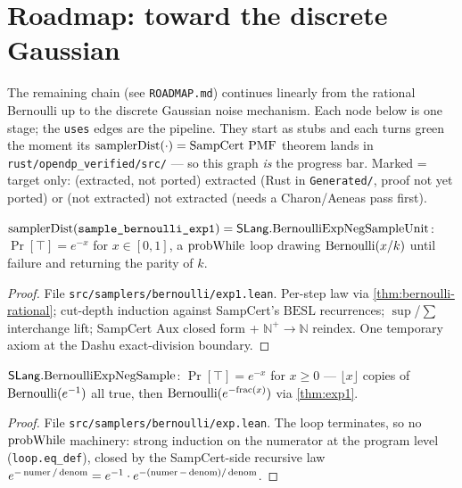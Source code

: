 \chapter{Roadmap: toward the discrete Gaussian}\label{chap:roadmap}

The remaining chain (see \texttt{ROADMAP.md}) continues linearly from the rational
Bernoulli up to the discrete Gaussian noise mechanism. Each node below is one
stage; the \texttt{uses} edges are the pipeline. They start as stubs and each turns
green the moment its \(\mathrm{samplerDist}(\cdot) = \text{SampCert PMF}\) theorem lands in
\texttt{rust/opendp\_verified/src/} --- so this graph \emph{is} the progress bar. Marked
\statusStub{} = target only: (extracted, not ported) extracted (Rust in \texttt{Generated/}, proof not
yet ported) or (not extracted) not extracted (needs a Charon/Aeneas pass first).

\begin{theorem}\label{thm:exp1}
  \leanok
  \(\mathrm{samplerDist}(\texttt{sample\_bernoulli\_exp1}) =
  \mathsf{SLang}.\mathrm{BernoulliExpNegSampleUnit}\): \(\Pr[\top] = e^{-x}\) for
  \(x \in [0,1]\), a \(\mathrm{probWhile}\) loop drawing \(\mathrm{Bernoulli}(x/k)\) until failure and
  returning the parity of \(k\). \statusDone
\end{theorem}
\begin{proof}\leanok
  File \texttt{src/samplers/bernoulli/exp1.lean}. Per-step law via
  \ref{thm:bernoulli-rational}; cut-depth induction against SampCert's
  \(\mathrm{BESL}\) recurrences; \(\sup\)/\(\sum\) interchange lift; SampCert
  \(\mathrm{Aux}\) closed form + \(\mathbb{N}^{+}\!\to\mathbb{N}\) reindex. One
  temporary axiom at the Dashu exact-division boundary.
\end{proof}

\begin{theorem}\label{thm:exp}
  \leanok
  \(\mathsf{SLang}.\mathrm{BernoulliExpNegSample}\): \(\Pr[\top]=e^{-x}\)
  for \(x \ge 0\) --- \(\lfloor x\rfloor\) copies of \(\mathrm{Bernoulli}(e^{-1})\) all true, then
  \(\mathrm{Bernoulli}(e^{-\mathrm{frac}(x)})\) via \ref{thm:exp1}. \statusDone
\end{theorem}
\begin{proof}\leanok
  File \texttt{src/samplers/bernoulli/exp.lean}. The loop terminates, so no
  \(\mathrm{probWhile}\) machinery: strong induction on the numerator at the program
  level (\texttt{loop.eq\_def}), closed by the SampCert-side recursive law
  \(e^{-\operatorname{numer}/\operatorname{denom}} = e^{-1}\cdot e^{-(\operatorname{numer}-\operatorname{denom})/\operatorname{denom}}\).
\end{proof}

